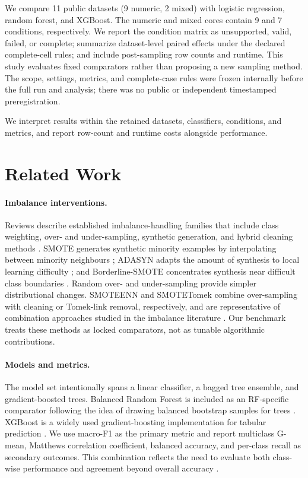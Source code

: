 \documentclass[10pt]{article}
\begin{document}
We compare 11 public datasets (9 numeric, 2 mixed) with logistic regression, random forest, and XGBoost. The numeric and mixed cores contain 9 and 7 conditions, respectively. We report the condition matrix as unsupported, valid, failed, or complete; summarize dataset-level paired effects under the declared complete-cell rules; and include post-sampling row counts and runtime. This study evaluates fixed comparators rather than proposing a new sampling method. The scope, settings, metrics, and complete-case rules were frozen internally before the full run and analysis; there was no public or independent timestamped preregistration.

We interpret results within the retained datasets, classifiers, conditions, and metrics, and report row-count and runtime costs alongside performance.

\section{Related Work}

\paragraph{Imbalance interventions.}
Reviews describe established imbalance-handling families that include class weighting, over- and under-sampling, synthetic generation, and hybrid cleaning methods \citep{he2009learning,branco2016survey}. SMOTE generates synthetic minority examples by interpolating between minority neighbours \citep{chawla2002smote}; ADASYN adapts the amount of synthesis to local learning difficulty \citep{he2008adasyn}; and Borderline-SMOTE concentrates synthesis near difficult class boundaries \citep{han2005borderline}. Random over- and under-sampling provide simpler distributional changes. SMOTEENN and SMOTETomek combine over-sampling with cleaning or Tomek-link removal, respectively, and are representative of combination approaches studied in the imbalance literature \citep{batista2004study}. Our benchmark treats these methods as locked comparators, not as tunable algorithmic contributions.

\paragraph{Models and metrics.}
The model set intentionally spans a linear classifier, a bagged tree ensemble, and gradient-boosted trees. Balanced Random Forest is included as an RF-specific comparator following the idea of drawing balanced bootstrap samples for trees \citep{chen2004using}. XGBoost is a widely used gradient-boosting implementation for tabular prediction \citep{chen2016xgboost}. We use macro-F1 as the primary metric and report multiclass G-mean, Matthews correlation coefficient, balanced accuracy, and per-class recall as secondary outcomes. This combination reflects the need to evaluate both class-wise performance and agreement beyond overall accuracy \citep{sokolova2009systematic,gorodkin2004comparing}.
\end{document}
